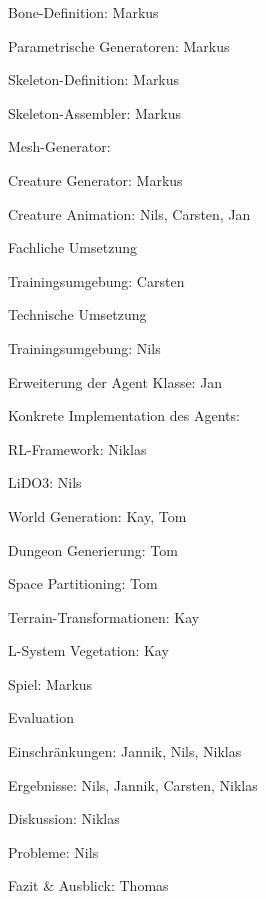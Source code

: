 \begin{thallok}
\begin{thallok}
\begin{thallok}
\begin{thallok}
					\item Bone-Definition: Markus
					\item Parametrische Generatoren: Markus
					\item Skeleton-Definition: Markus
					\item Skeleton-Assembler: Markus
					\item Mesh-Generator:
					\item Creature Generator: Markus
				\end{thallok}
		\end{thallok}
		\item Creature Animation: Nils, Carsten, Jan
		\begin{thallok}
			\item Fachliche Umsetzung
				\begin{thallok}
					\item Trainingsumgebung: Carsten
				\end{thallok}
			\item Technische Umsetzung
				\begin{thallok}
					\item Trainingsumgebung: Nils
					\item Erweiterung der Agent Klasse: Jan
					\item Konkrete Implementation des Agents:
					\item RL-Framework: Niklas
					\item LiDO3: Nils
				\end{thallok}
		\end{thallok}
		\item World Generation: Kay, Tom
		\begin{thallok}
			\item Dungeon Generierung: Tom
			\item Space Partitioning: Tom
			\item Terrain-Transformationen: Kay
			\item L-System Vegetation: Kay
		\end{thallok}
		\item Spiel: Markus
	\end{thallok}
	\item Evaluation
	\begin{thallok}
		\item Einschränkungen: Jannik, Nils, Niklas
		\item Ergebnisse: Nils, Jannik, Carsten, Niklas
		\item Diskussion: Niklas
		\item Probleme: Nils
	\end{thallok}
	\item Fazit \& Ausblick: Thomas
\end{thallok}


